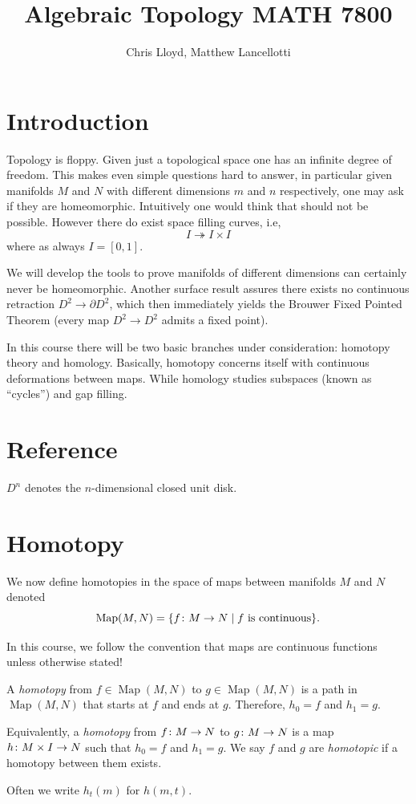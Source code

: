 \documentclass[11pt,leqno,oneside]{amsart}
\title[Algebraic Topology]{Algebraic Topology MATH 7800}
\author{Chris Lloyd, Matthew Lancellotti}
\date{}
\newenvironment{dateenv}{
  \vspace{1em}
}{
  \vspace{1em}
}
\newcommand{\mydate}[4]{
  \newdate{#1}{#2}{#3}{#4}
  \begin{dateenv}
    \hfill\displaydate{#1}
  \end{dateenv}
}
\numberwithin{thm}{section}
\renewcommand{\d}{\partial}
\newcommand{\x}{\times}
\newcommand{\Map}{\operatorname{Map}}
\begin{document}
\maketitle \newpage

\mydate{d1}{18}{1}{2017}

\section{Introduction}

Topology is floppy. Given just a topological space one has an infinite
degree of freedom. This makes even simple questions hard to answer, in
particular given manifolds \(M\) and \(N\) with different dimensions
\(m\) and \(n\) respectively, one may ask if they are
homeomorphic. Intuitively one would think that should not be
possible. However there do exist space filling curves, i.e,
\[I \twoheadrightarrow I \times I\]
where as always \(I=[0,1]\).

We will develop the tools to prove manifolds of different dimensions can
certainly never be homeomorphic. Another surface result assures there exists no continuous
retraction \(D^2 \to \d D^2\), which then immediately yields the
Brouwer Fixed Pointed Theorem (every map \(D^2 \to D^2\) admits a
fixed point).

In this course there will be two basic branches under consideration:
homotopy theory and homology. Basically, homotopy concerns itself with
continuous deformations between maps. While homology studies subspaces
(known as ``cycles'') and gap filling.

\section{Reference}
%
\begin{defn}
  $D^n$ denotes the $n$-dimensional closed unit disk.
\end{defn}

\section{Homotopy}

We now define homotopies in the space of maps between manifolds \(M\)
and \(N\) denoted
\[\Map(M,N)=\{f \from M \to N \suchthat \text{$f$ is continuous}\}.\]

In this course, we follow the convention that maps are continuous
functions unless otherwise stated!

\begin{defn}
  A \emph{homotopy} from \(f \in \Map(M, N)\) to \(g \in \Map(M, N)\) is a path in $\Map(M, N)$ that starts at $f$ and ends at $g$.  Therefore, $h_0 = f$ and $h_1 = g$.

  Equivalently, a \emph{homotopy} from \(f \colon M \to N\) to \(g \colon M \to N\)
  is a map \(h\from M \x I \to N\) such that \(h_0=f\) and \(h_1=g\). We say \(f\) and
  \(g\) are \emph{homotopic} if a homotopy between them exists.

  Often we write \(h_t(m)\) for \(h(m,t)\).
\end{defn}
\end{document}
